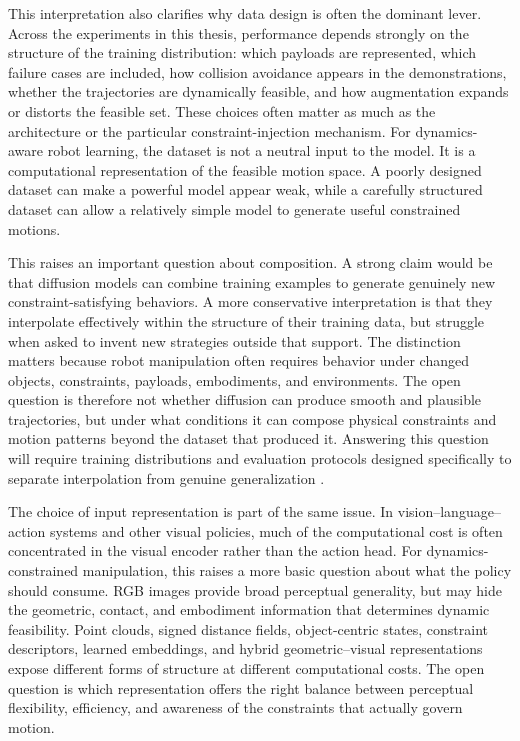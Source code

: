 This interpretation also clarifies why data design is often the dominant lever.
Across the experiments in this thesis, performance depends strongly on the structure of the training distribution: which payloads are represented, which failure cases are included, how collision avoidance appears in the demonstrations, whether the trajectories are dynamically feasible, and how augmentation expands or distorts the feasible set.
These choices often matter as much as the architecture or the particular constraint-injection mechanism.
For dynamics-aware robot learning, the dataset is not a neutral input to the model.
It is a computational representation of the feasible motion space.
A poorly designed dataset can make a powerful model appear weak, while a carefully structured dataset can allow a relatively simple model to generate useful constrained motions.

This raises an important question about composition.
A strong claim would be that diffusion models can combine training examples to generate genuinely new constraint-satisfying behaviors.
A more conservative interpretation is that they interpolate effectively within the structure of their training data, but struggle when asked to invent new strategies outside that support.
The distinction matters because robot manipulation often requires behavior under changed objects, constraints, payloads, embodiments, and environments.
The open question is therefore not whether diffusion can produce smooth and plausible trajectories, but under what conditions it can compose physical constraints and motion patterns beyond the dataset that produced it.
Answering this question will require training distributions and evaluation protocols designed specifically to separate interpolation from genuine generalization .

The choice of input representation is part of the same issue.
In vision--language--action systems and other visual policies, much of the computational cost is often concentrated in the visual encoder rather than the action head.
For dynamics-constrained manipulation, this raises a more basic question about what the policy should consume.
RGB images provide broad perceptual generality, but may hide the geometric, contact, and embodiment information that determines dynamic feasibility.
Point clouds, signed distance fields, object-centric states, constraint descriptors, learned embeddings, and hybrid geometric--visual representations expose different forms of structure at different computational costs.
The open question is which representation offers the right balance between perceptual flexibility, efficiency, and awareness of the constraints that actually govern motion.

